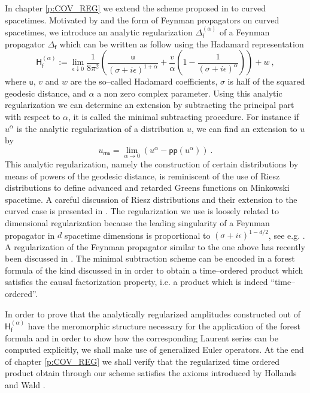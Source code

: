 \documentclass[11pt]{book}
\newcommand{\pp}{\mathsf{pp}}
\newcommand{\ms}{\mathsf{ms}}
\newcommand{\Hsf}{\mathsf{H}}
\newcommand{\fsf}{\mathsf{f}}
\newcommand{\usf}{\mathsf{u}}
\theoremstyle{break}
\begin{document}
In chapter \ref{p:COV_REG} we extend the scheme proposed in \cite{DFKR_2014} to curved spacetimes. Motivated by \cite{BG_1972} and the form of Feynman propagators on curved spacetimes, we introduce an analytic regularization $\Delta^{(\alpha)}_\fsf$ of a Feynman propagator $\Delta_\fsf$ which can be written as follow using the Hadamard representation
%
\begin{equation*}
\Hsf^{(\alpha)}_\fsf := \lim_{\epsilon \downarrow 0} \frac{1}{8\pi^2} \left(\frac{\usf}{(\sigma+i\epsilon )^{1+\alpha}} + \frac{v}{\alpha} \left(1-\frac{1}{(\sigma+i\epsilon )^{\alpha}}\right)\right) + w \ ,
\end{equation*}
%
where $\usf$, $v$ and $w$ are the so--called Hadamard coefficients, $\sigma$ is half of the squared geodesic distance, and $\alpha$ a non zero complex parameter. Using this analytic regularization we can determine an extension by subtracting the principal part with respect to $\alpha$, it is called the minimal subtracting procedure. For instance if $u^\alpha$ is the analytic regularization of a distribution $u$, we can find an extension to $u$ by
%
\begin{equation*}
u_\ms = \lim_{\alpha \to 0} \left( u^\alpha - \pp(u^\alpha) \right) \ .
\end{equation*}
%
This analytic regularization, namely the construction of certain distributions by means of powers of the geodesic distance, is reminiscent of the use of Riesz distributions to define advanced and retarded Greens functions on Minkowski spacetime. A careful discussion of Riesz distributions and their extension to the curved case is presented in \cite{BGP_2007}. The regularization we use is loosely related to dimensional regularization because the leading singularity of a Feynman propagator in $d$ spacetime dimensions is proportional to $(\sigma+i\epsilon)^{1-d/2}$, see e.g. \cite[Appendix A]{MORETTI_2003}. A regularization of the Feynman propagator similar to the one above has recently been discussed in \cite{DANG_2015}. The minimal subtraction scheme can be encoded in a forest formula of the kind discussed in \cite{HOLLANDS_2010,KELLER_2010,DFKR_2014} in order to obtain a time--ordered product which satisfies the causal factorization property, i.e. a product which is indeed ``time--ordered''. 


In order to prove that the analytically regularized amplitudes constructed out of $\Hsf^{(\alpha)}_\fsf$ have the meromorphic structure necessary for the application of the forest formula and in order to show how the corresponding Laurent series can be computed explicitly, we shall make use of generalized Euler operators. At the end of chapter \ref{p:COV_REG} we shall verify that the regularized time ordered product obtain through our scheme satisfies the axioms introduced by Hollands and Wald \cite{HW_2001,HW_2002}.
\end{document}
